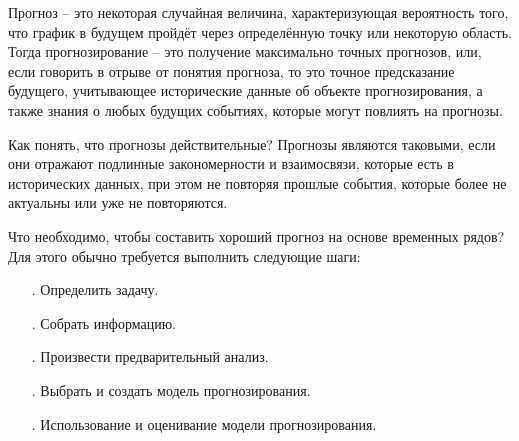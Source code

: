 {\gostFont
	
	\par \redline Прогноз {--} это некоторая случайная величина, характеризующая вероятность того, что график в будущем пройдёт через определённую точку или некоторую область. Тогда прогнозирование {--} это получение максимально точных прогнозов, или, если говорить в отрыве от понятия прогноза, то это точное предсказание будущего, учитывающее исторические данные об объекте прогнозирования, а также знания о любых будущих событиях, которые могут повлиять на прогнозы. 
	
	\par \redline Как понять, что прогнозы действительные? Прогнозы являются таковыми, если они отражают подлинные закономерности и взаимосвязи, которые есть в исторических данных, при этом не повторяя прошлые события, которые более не актуальны или уже не повторяются. 
	
	\par \redline Что необходимо, чтобы составить хороший прогноз на основе временных рядов? Для этого обычно требуется выполнить следующие шаги:
	
	
	\begin{itemize}[leftmargin=2.15cm, labelwidth=0.65cm, labelsep=0.0cm] 
		
		\item[\theitemcntr. ] Определить задачу. 
		\addtocounter{itemcntr}{1}
		
		\item[\theitemcntr. ] Собрать информацию.
		\addtocounter{itemcntr}{1}
		
		\item[\theitemcntr. ] Произвести предварительный анализ.
		\addtocounter{itemcntr}{1}
		
		\item[\theitemcntr. ] Выбрать и создать модель прогнозирования.
		\addtocounter{itemcntr}{1}
		
		\item[\theitemcntr. ] Использование и оценивание модели прогнозирования. 
		\addtocounter{itemcntr}{1}
		
		\setcounter{itemcntr}{1}
	\end{itemize}
	
}
